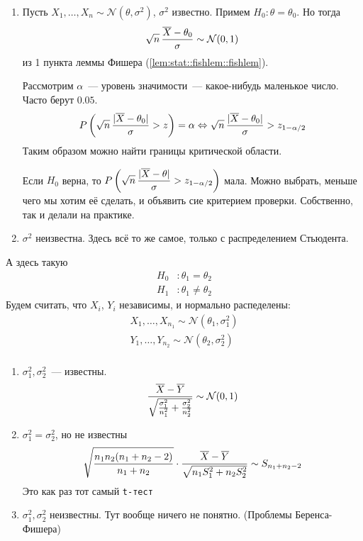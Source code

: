 \documentclass[12pt,ebook]{../../../notes}
\begin{document}
\begin{enumerate}
  \item Пусть $X_1, \dotsc, X_n \sim \mathcal N(\theta,\sigma^2)$, $\sigma^2$ известно.
    Примем $H_0 \colon \theta = \theta_0$. Но тогда \[
      \sqrt n\, \frac{\overline{X} -\theta_0}{\sigma}\sim \mathcal N(0,1)
    \]
    из 1 пункта леммы Фишера (\ref{lem:stat::fishlem::fishlem}). 

    Рассмотрим $\alpha$~--- уровень значимости~--- какое-нибудь маленькое число. 
    Часто берут $0.05$. 
    \[
      P\left(\sqrt n\, \frac{|\overline{X} -\theta_0|}{\sigma} > z \right) = \alpha \Leftrightarrow 
      \sqrt n\, \frac{|\overline{X} -\theta_0|}{\sigma} > z_{1-\alpha/2}
    \]
    Таким образом можно найти границы критической области. 

    Если $H_0$ верна, то $\displaystyle P\left(\sqrt n\, \frac{|\overline{X} - \theta|}{\sigma} >
    z_{1-\alpha/2}\right)$ мала. Можно выбрать, меньше чего мы хотим её сделать, и объявить сие
      критерием проверки. Собственно, так и делали на практике.
  \item $\sigma^2$ неизвестна. Здесь всё то же самое, только с распределением Стьюдента. 
\end{enumerate}
А здесь такую
\[
  \begin{split}
    H_0 & \colon \theta_1 = \theta_2 \\
    H_1 & \colon \theta_1 \neq \theta_2 
  \end{split} 
\]
Будем считать, что $X_i$, $Y_i$ независимы, и нормально распеделены:\[
  \begin{split}
    X_1, \dotsc, X_{n_1} \sim \mathcal N (\theta_1, \sigma_1^2) \\
    Y_1, \dotsc, Y_{n_2} \sim \mathcal N(\theta_2, \sigma_2^2) \\
  \end{split}
\]
\begin{enumerate}
  \item $\sigma_1^2, \sigma_2^2$~--- известны.
    \[
      \frac{\overline{X} - \overline{Y}}{\sqrt{\frac{\sigma_1^2}{n_1^2} + \frac{\sigma_2^2}{n_2^2} }} \sim
      \mathcal N (0,1) 
    \]
  \item $\sigma_1^2 = \sigma_2^2$, но не известны
    \[
      \sqrt{\frac{n_1n_2(n_1 + n_2  -2)}{n_1 + n_2} } \cdot \frac{\overline{X} - \overline{Y}}{\sqrt{n_1 S_1^2
      + n_2 S_2^2}} \sim S_{n_1 + n_2 - 2}
    \]
    Это как раз тот самый \texttt{t-тест}
  \item $\sigma_1^2, \sigma_2^2$ неизвестны. Тут вообще ничего не понятно. (Проблемы
    Беренса-Фишера)
\end{enumerate}
\end{document}

